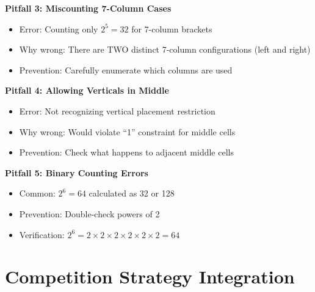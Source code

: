 \documentclass[12pt]{article}
\begin{document}
\begin{solutionbox}
\textbf{Pitfall 3: Miscounting 7-Column Cases}
\begin{itemize}
    \item Error: Counting only $2^5 = 32$ for 7-column brackets
    \item Why wrong: There are TWO distinct 7-column configurations (left and right)
    \item Prevention: Carefully enumerate which columns are used
\end{itemize}

\textbf{Pitfall 4: Allowing Verticals in Middle}
\begin{itemize}
    \item Error: Not recognizing vertical placement restriction
    \item Why wrong: Would violate ``1'' constraint for middle cells
    \item Prevention: Check what happens to adjacent middle cells
\end{itemize}

\textbf{Pitfall 5: Binary Counting Errors}
\begin{itemize}
    \item Common: $2^6 = 64$ calculated as 32 or 128
    \item Prevention: Double-check powers of 2
    \item Verification: $2^6 = 2 \times 2 \times 2 \times 2 \times 2 \times 2 = 64$
\end{itemize}

\end{solutionbox}

\section{Competition Strategy Integration}
\end{document}
